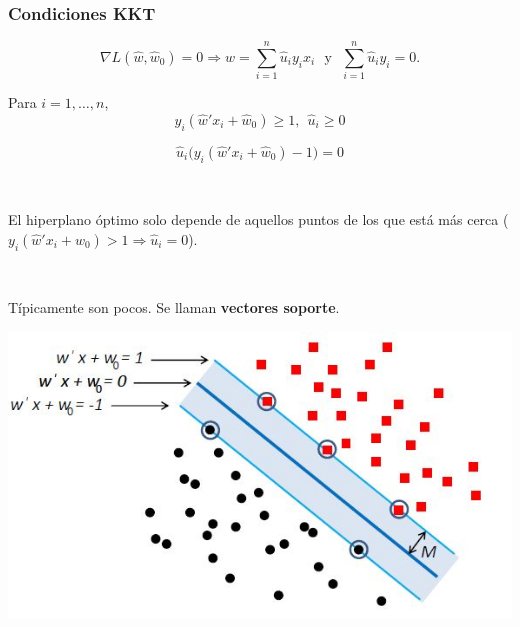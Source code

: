 \documentclass[dvipsnames, pdflatex,slidecentered]{beamer}
\begin{document}
\begin{frame}[plain]
\frametitle{Condiciones KKT}

\[
\nabla L(\hat w,\hat w_0) = 0 \Rightarrow \hat w = \sum_{i=1}^n \hat u_i y_i x_i\ \ \ \mbox{y}\ \  \  \sum_{i=1}^n \hat u_i y_i = 0.
\]


Para $i=1,\ldots, n$,
\[
y_i(\hat w' x_i + \hat w_0)\geq 1, \ \ \hat u_i\geq 0
\]


\[
\hat u_i\big( y_i(\hat w' x_i + \hat w_0) - 1\big) = 0
\]

\

El hiperplano óptimo solo depende de aquellos puntos de los que está más cerca ($ y_i(\hat w' x_i + \hat w_0) > 1\Rightarrow \hat u_i=0$). 

\


Típicamente son pocos. Se llaman \textbf{vectores soporte}.

\end{frame}
\begin{frame}[plain]

\begin{center}
\includegraphics[scale=0.7]{soporte.jpg}
\end{center}

\end{frame}
\end{document}
